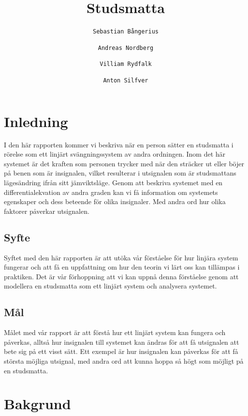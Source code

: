 \documentclass[10pt,a4paper]{article}
\author{
  \texttt{Sebastian Bångerius}
  \and
  \texttt{Andreas Nordberg}
  \and
  \texttt{Villiam Rydfalk}
  \and
  \texttt{Anton Silfver}
}
\begin{document}

\title{Studsmatta}
\maketitle

\cleardoublepage

\tableofcontents

\clearpage

\section{Inledning}
\setcounter{page}{3}

I den här rapporten kommer vi beskriva när en person sätter en studsmatta i rörelse som ett linjärt svängningssystem av andra ordningen. Inom det här systemet är det kraften som personen trycker med när den sträcker ut eller böjer på benen som är insignalen, vilket resulterar i utsignalen som är studsmattans lägesändring ifrån sitt jämviktsläge. Genom att beskriva systemet med en differentialekvation av andra graden kan vi få information om systemets egenskaper och dess beteende för olika insignaler. Med andra ord hur olika faktorer påverkar utsignalen.

\subsection{Syfte}
Syftet med den här rapporten är att utöka vår förståelse för hur linjära system fungerar och att få en uppfattning om hur den teorin vi lärt oss kan tillämpas i praktiken. Det är vår förhoppning att vi kan uppnå denna förståelse genom att modellera en studsmatta som ett linjärt system och analysera systemet.

\subsection{Mål}
Målet med vår rapport är att förstå hur ett linjärt system kan fungera och påverkas, alltså hur insignalen till systemet kan ändras för att få utsignalen att bete sig på ett visst sätt. Ett exempel är hur insignalen kan påverkas för att få största möjliga utsignal, med andra ord att kunna hoppa så högt som möjligt på en studsmatta.

\section{Bakgrund}
\end{document}
